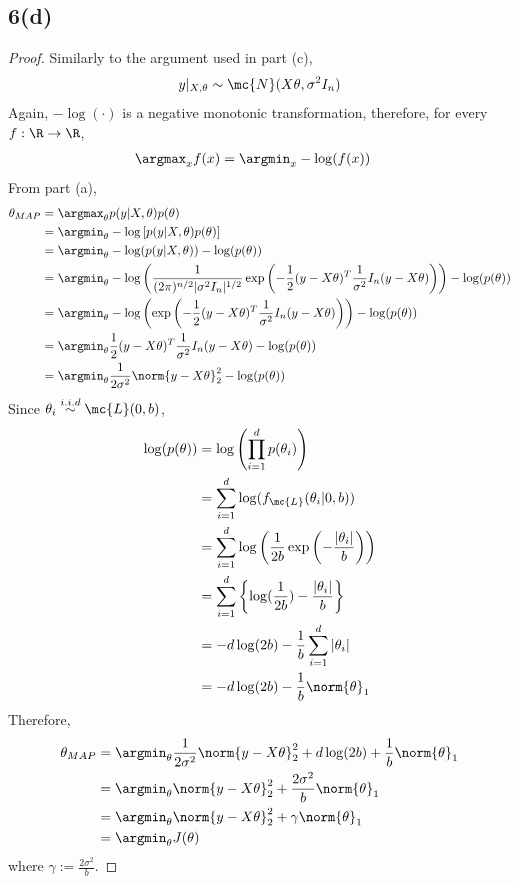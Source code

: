 \documentclass[11pt]{article}
\begin{document}
	\newpage
	\subsection{6(d)}
	\begin{proof}
		Similarly to the argument used in part (c), 
		\begin{align}
			y|_{X, \theta} \sim \mc{N}(X \theta, \sigma^2 I_n)
		\end{align}
		Again, $-\log(\cdot)$ is a negative monotonic transformation, therefore, for every $f: \R \to \R$,
		\begin{align}
			\argmax_x f(x) &= \argmin_x - \log(f(x))
		\end{align}
		From part (a),
		\begin{align}
			\theta_{MAP} &= \argmax_\theta p(y|X, \theta) p(\theta) \\
			&= \argmin_\theta -\log \left[p(y|X, \theta) p(\theta)\right] \\
			&= \argmin_\theta -\log(p(y|X, \theta)) - \log(p(\theta)) \\
			&= \argmin_\theta -\log \left (
			\frac{1}{(2\pi)^{n/2} |\sigma^2 I_n|^{1/2}}
			\exp \left(
			-\frac{1}{2} (y - X\theta)^T \frac{1}{\sigma^2} I_n (y - X\theta)
			\right)
			\right) - \log(p(\theta)) \\
			&= \argmin_\theta -\log \left (\exp \left(
			-\frac{1}{2} (y - X\theta)^T \frac{1}{\sigma^2} I_n (y - X\theta)
			\right)
			\right) - \log(p(\theta)) \\
			&= \argmin_\theta \frac{1}{2} (y - X\theta)^T \frac{1}{\sigma^2} I_n (y - X\theta) - \log(p(\theta)) \\
			&= \argmin_\theta \frac{1}{2 \sigma^2} \norm{y - X\theta}^2_2 - \log(p(\theta))
		\end{align}
		Since $\theta_i \overset{i.i.d}{\sim} \mc{L}(0, b)$, 
		\begin{align}
			\log(p(\theta)) &= \log \left( \prod_{i=1}^d p(\theta_i) \right) \\
			&= \sum_{i=1}^d \log(f_{\mc{L}} (\theta_i|0, b)) \\
			&= \sum_{i=1}^d \log\left(\frac{1}{2b} \exp \left(- \frac{|\theta_i|}{b} \right) \right) \\
			&= \sum_{i=1}^d \left \{
			\log(\frac{1}{2b}) - \frac{|\theta_i|}{b}
			\right \} \\
			&= -d\log(2b) - \frac{1}{b} \sum_{i=1}^d |\theta_i| \\
			&= -d\log(2b) - \frac{1}{b} \norm{\theta}_1
		\end{align}
		Therefore,
		\begin{align}
			\theta_{MAP} &= \argmin_\theta \frac{1}{2\sigma^2} \norm{y - X\theta}_2^2 + d \log(2b) + \frac{1}{b} \norm{\theta}_1 \\
			&= \argmin_\theta \norm{y - X\theta}_2^2 + \frac{2\sigma^2}{b} \norm{\theta}_1 \\
			&= \argmin_\theta \norm{y - X\theta}_2^2 + \gamma \norm{\theta}_1 \\
			&= \argmin_\theta J(\theta)
		\end{align}
		where $\gamma := \frac{2\sigma^2}{b}$.
	\end{proof}
\end{document}
